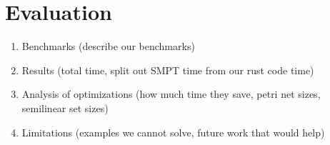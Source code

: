 \section{Evaluation}
\label{sec:evaluation}

\begin{enumerate}
    \item Benchmarks (describe our benchmarks)
    \item Results (total time, split out SMPT time from our rust code time)
    \item Analysis of optimizations (how much time they save, petri net sizes, semilinear set sizes)
    \item Limitations (examples we cannot solve, future work that would help)
\end{enumerate}





